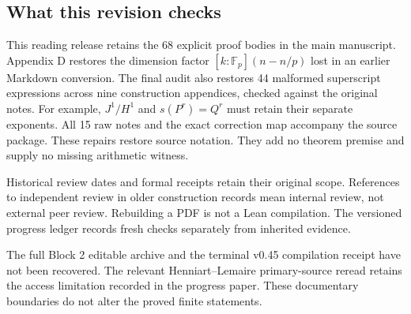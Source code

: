 \subsection*{What this revision checks}
This reading release retains the 68 explicit proof bodies in the main manuscript. Appendix D restores the dimension factor \([k:\mathbb F_p](n-n/p)\) lost in an earlier Markdown conversion. The final audit also restores 44 malformed superscript expressions across nine construction appendices, checked against the original notes. For example, \(J^1/H^1\) and \(s(P^r)=Q^r\) must retain their separate exponents. All 15 raw notes and the exact correction map accompany the source package. These repairs restore source notation. They add no theorem premise and supply no missing arithmetic witness.

Historical review dates and formal receipts retain their original scope. References to independent review in older construction records mean internal review, not external peer review. Rebuilding a PDF is not a Lean compilation. The versioned progress ledger records fresh checks separately from inherited evidence.

The full Block 2 editable archive and the terminal v0.45 compilation receipt have not been recovered. The relevant Henniart--Lemaire primary-source reread retains the access limitation recorded in the progress paper. These documentary boundaries do not alter the proved finite statements.

\endgroup
